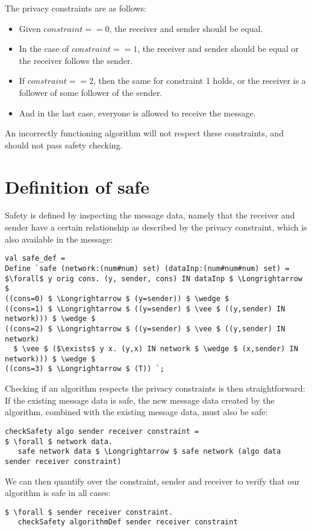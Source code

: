 \documentclass[10pt,a4paper]{article}
\begin{document}
	The privacy constraints are as follows:
	\begin{itemize}
		\item Given $ constraint == 0 $, the receiver and sender should be equal.
		\item In the case of $ constraint == 1 $, the receiver and sender should be equal or the receiver follows the sender.
		\item If $ constraint == 2 $, then the same for constraint 1 holds, or the receiver is a follower of some follower of the sender.
		\item And in the last case, everyone is allowed to receive the message.
	\end{itemize}

	An incorrectly functioning algorithm will not respect these constraints, and should not pass safety checking.
	
	\section{Definition of safe}
	
	Safety is defined by inspecting the message data, namely that the receiver and sender have a certain relationship as described by the privacy constraint, which is also available in the message:

	\begin{lstlisting}[mathescape=true]
val safe_def = 
Define `safe (network:(num#num) set) (dataInp:(num#num#num) set) = 
$\forall$ y orig cons. (y, sender, cons) IN dataInp $ \Longrightarrow $ 
((cons=0) $ \Longrightarrow $ (y=sender)) $ \wedge $ 
((cons=1) $ \Longrightarrow $ ((y=sender) $ \vee $ ((y,sender) IN network))) $ \wedge $ 
((cons=2) $ \Longrightarrow $ ((y=sender) $ \vee $ ((y,sender) IN network) 
  $ \vee $ ($\exists$ y x. (y,x) IN network $ \wedge $ (x,sender) IN network))) $ \wedge $ 
((cons=3) $ \Longrightarrow $ (T)) `; 
	\end{lstlisting}

	Checking if an algorithm respects the privacy constraints is then straightforward:
	If the existing message data is safe, the new message data created by the algorithm, combined with the existing message data, must also be safe:

\begin{lstlisting}[mathescape=true]
checkSafety algo sender receiver constraint =
$ \forall $ network data. 
   safe network data $ \Longrightarrow $ safe network (algo data sender receiver constraint)
\end{lstlisting}

	We can then quantify over the constraint, sender and receiver to verify that our algorithm is safe in all cases:

	\begin{lstlisting}[mathescape=true]
$ \forall $ sender receiver constraint. 
   checkSafety algorithmDef sender receiver constraint
	\end{lstlisting}
	
\end{document}
